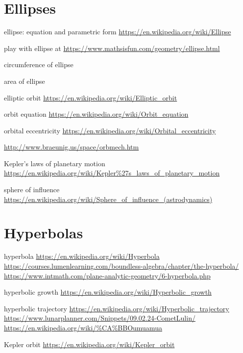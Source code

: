 \documentclass[a4paper,oneside,12pt]{article}
\begin{document}
\section{Ellipses}

{\color{red}
\begin{packeditem}
\item ellipse: equation and parametric form
  \url{https://en.wikipedia.org/wiki/Ellipse}

\item play with ellipse at
  \url{https://www.mathsisfun.com/geometry/ellipse.html}

\item circumference of ellipse

\item area of ellipse

\item elliptic orbit
  \url{https://en.wikipedia.org/wiki/Elliptic_orbit}

\item orbit equation
  \url{https://en.wikipedia.org/wiki/Orbit_equation}

\item orbital eccentricity
  \url{https://en.wikipedia.org/wiki/Orbital_eccentricity}

\item \url{http://www.braeunig.us/space/orbmech.htm}

\item Kepler's laws of planetary motion
  \url{https://en.wikipedia.org/wiki/Kepler\%27s_laws_of_planetary_motion}

\item sphere of influence
  \url{https://en.wikipedia.org/wiki/Sphere_of_influence_(astrodynamics)}
\end{packeditem}
}



\section{Hyperbolas}

{\color{red}
\begin{packeditem}
\item hyperbola
  \url{https://en.wikipedia.org/wiki/Hyperbola}
  \url{https://courses.lumenlearning.com/boundless-algebra/chapter/the-hyperbola/}
  \url{https://www.intmath.com/plane-analytic-geometry/6-hyperbola.php}

\item hyperbolic growth
  \url{https://en.wikipedia.org/wiki/Hyperbolic_growth}

\item hyperbolic trajectory
  \url{https://en.wikipedia.org/wiki/Hyperbolic_trajectory}
  \url{https://www.lunarplanner.com/Snippets/09.02.24-CometLulin/}
  \url{https://en.wikipedia.org/wiki/\%CA\%BBOumuamua}

\item Kepler orbit
  \url{https://en.wikipedia.org/wiki/Kepler_orbit}
\end{packeditem}
}
\end{document}
